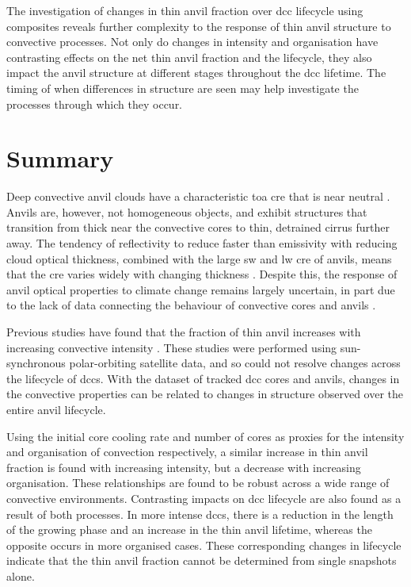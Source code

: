 The investigation of changes in thin anvil fraction over \acrshort{dcc} lifecycle using composites reveals further complexity to the response of thin anvil structure to convective processes.
Not only do changes in intensity and organisation have contrasting effects on the net thin anvil fraction and the lifecycle, they also impact the anvil structure at different stages throughout the \acrshort{dcc} lifetime.
The timing of when differences in structure are seen may help investigate the processes through which they occur.


\section{Summary}

Deep convective anvil clouds have a characteristic \acrshort{toa} \acrshort{cre} that is near neutral \citep{hartmann_tropical_2016}.
Anvils are, however, not homogeneous objects, and exhibit structures that transition from thick near the convective cores to thin, detrained cirrus further away.
The tendency of reflectivity to reduce faster than emissivity with reducing cloud optical thickness, combined with the large \acrshort{sw} and \acrshort{lw} \acrshort{cre} of anvils, means that the \acrshort{cre} varies widely with changing thickness \citep{berry_cloud_2014}.
Despite this, the response of anvil optical properties to climate change remains largely uncertain, in part due to the lack of data connecting the behaviour of convective cores and anvils \cite{gasparini_opinion_2023}.

Previous studies have found that the fraction of thin anvil increases with increasing convective intensity \citep{protopapadaki_upper_2017, takahashi_relationships_2017}.
These studies were performed using sun-synchronous polar-orbiting satellite data, and so could not resolve changes across the lifecycle of \acrshort{dcc}s.
With the dataset of tracked \acrshort{dcc} cores and anvils, changes in the convective properties can be related to changes in structure observed over the entire anvil lifecycle.

Using the initial core cooling rate and number of cores as proxies for the intensity and organisation of convection respectively, a similar increase in thin anvil fraction is found with increasing intensity, but a decrease with increasing organisation.
These relationships are found to be robust across a wide range of convective environments.
Contrasting impacts on \acrshort{dcc} lifecycle are also found as a result of both processes.
In more intense \acrshort{dcc}s, there is a reduction in the length of the growing phase and an increase in the thin anvil lifetime, whereas the opposite occurs in more organised cases.
These corresponding changes in lifecycle indicate that the thin anvil fraction cannot be determined from single snapshots alone.

